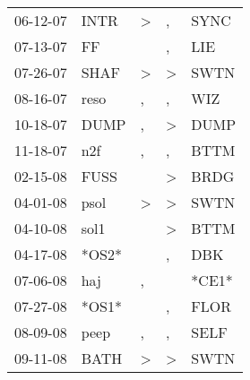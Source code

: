 \begin{supertabular}{p{0.07\textwidth}p{0.06\textwidth}p{0.02\textwidth}p{0.02\textwidth}p{0.06\textwidth}}
          06-12-07\textsuperscript{} &           INTR\textsuperscript{} &     \textgreater &                , &           SYNC\textsuperscript{} \\
          07-13-07\textsuperscript{} &             FF\textsuperscript{} &                  &                , &            LIE\textsuperscript{} \\
          07-26-07\textsuperscript{} &           SHAF\textsuperscript{} &     \textgreater &     \textgreater &           SWTN\textsuperscript{} \\
          08-16-07\textsuperscript{} &           reso\textsuperscript{} &                , &                , &            WIZ\textsuperscript{} \\
          10-18-07\textsuperscript{} &           DUMP\textsuperscript{} &                , &     \textgreater &           DUMP\textsuperscript{} \\
          11-18-07\textsuperscript{} &            n2f\textsuperscript{} &                , &                , &           BTTM\textsuperscript{} \\
          02-15-08\textsuperscript{} &           FUSS\textsuperscript{} &                  &     \textgreater &           BRDG\textsuperscript{} \\
          04-01-08\textsuperscript{} &           psol\textsuperscript{} &     \textgreater &     \textgreater &           SWTN\textsuperscript{} \\
          04-10-08\textsuperscript{} &           sol1\textsuperscript{} &                  &     \textgreater &           BTTM\textsuperscript{} \\
          04-17-08\textsuperscript{} &                            *OS2* &                  &                , &            DBK\textsuperscript{} \\
          07-06-08\textsuperscript{} &            haj\textsuperscript{} &                , &                  &                            *CE1* \\
          07-27-08\textsuperscript{} &                            *OS1* &                  &                , &           FLOR\textsuperscript{} \\
          08-09-08\textsuperscript{} &           peep\textsuperscript{} &                , &                , &           SELF\textsuperscript{} \\
          09-11-08\textsuperscript{} &           BATH\textsuperscript{} &     \textgreater &     \textgreater &           SWTN\textsuperscript{} \\

\end{supertabular}
